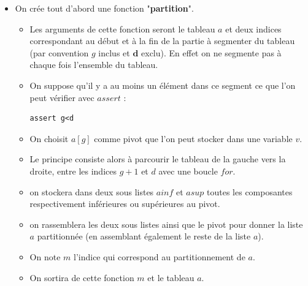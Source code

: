 \begin{itemize}
\item On crée tout d'abord une fonction "\textbf{partition}". 
\begin{itemize}
\item Les arguments de cette fonction seront le tableau \textbf{$a$} et deux indices correspondant au début et à la fin de la partie à segmenter du tableau (par convention \textbf{$g$} inclus et $\textbf{d}$ exclu). En effet on ne segmente pas à chaque fois l'ensemble du tableau.
\item On suppose qu'il y a au moins un élément dans ce segment ce que l'on peut vérifier avec \textbf{$assert$} : 


	\begin{DDbox}{\linewidth}
		\begin{verbatim}
assert g<d
		\end{verbatim}
	\end{DDbox}
\item On choisit \textbf{$a[g]$} comme pivot que l'on peut stocker dans une variable $v$.
\item Le principe consiste alors à parcourir le tableau de la gauche vers la droite, entre les indices \textbf{$g+1$} et \textbf{$d$} avec une boucle \textbf{$for$}.
\item on stockera dans deux sous listes \textbf{$ainf$} et \textbf{$asup$} toutes les composantes respectivement inférieures ou supérieures au pivot.
\item on rassemblera les deux sous listes ainsi que le pivot pour donner la liste \textbf{$a$} partitionnée (en assemblant également le reste de la liste $a$).
\item On note $m$ l'indice qui correspond au partitionnement de $a$.
\item On sortira de cette fonction $m$ et le tableau $a$.
\end{itemize}

\begin{algorithme}
\ifprof
\begin{center}
		
\end{center}
\fi
\end{algorithme}




\end{itemize}
